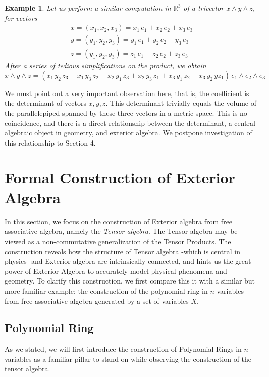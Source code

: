 \documentclass[12pt]{article}
\newtheorem{example}[theorem]{Example}
\numberwithin{theorem}{section}
\numberwithin{equation}{theorem}
\begin{document}
\begin{example}\label{wedgedet}
    Let us perform a similar computation in $\mathbb{R}^3$ of a trivector $x \wedge y \wedge z$, for vectors
    \begin{gather*}
        x = (x_1, x_2, x_3) = x_1\,e_1 + x_2\,e_2 + x_3\,e_3\\
        y = (y_1, y_2, y_3) = y_1\,e_1 + y_2\,e_2 + y_3\,e_3\\
        z = (y_1, y_2, y_3) = z_1\,e_1 + z_2\,e_2 + z_3\,e_3
    \end{gather*}
    After a series of tedious simplifications on the product, we obtain
    $$
    x \wedge y \wedge z = (
    x_1\,y_2\,z_3 - x_1\,y_3\,z_2 - x_2\,y_1\,z_3 + x_2\,y_3\,z_1 + x_3\,y_1\,z_2 - x_3\,y_2\,yz_1 ) \, e_1 \wedge e_2 \wedge e_3
    $$
    {\color{blue}}
\end{example}

We must point out a very important observation here, that is, the coefficient is the determinant of vectors $x, y, z$. This determinant trivially equals the volume of the parallelepiped spanned by these three vectors in a metric space. This is no coincidence, and there is a direct relationship between the determinant, a central algebraic object in geometry, and exterior algebra. We postpone investigation of this relationship to Section 4.







\pagebreak

\section{Formal Construction of Exterior Algebra}

In this section, we focus on the construction of Exterior algebra from free associative algebra, namely the \emph{Tensor algebra}. The Tensor algebra may be viewed as a non-commutative generalization of the Tensor Products. The construction reveals how the structure of Tensor algebra -which is central in physics- and Exterior algebra are intrinsically connected, and hints us the great power of Exterior Algebra to accurately model physical phenomena and geometry.
To clarify this construction, we first compare this it with a similar but more familiar example: the construction of the polynomial ring in $n$ variables from free associative algebra generated by a set of variables $X$.

\subsection{Polynomial Ring}
As we stated, we will first introduce the construction of Polynomial Rings in $n$ variables as a familiar pillar to stand on while observing the construction of the tensor algebra.
\end{document}
